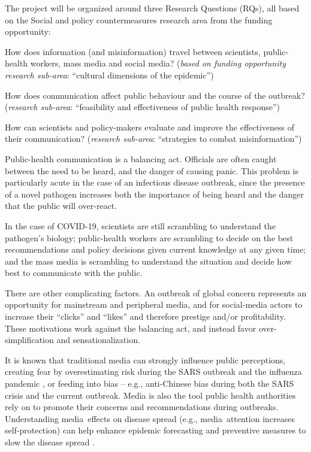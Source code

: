 The project will be organized around three Research Questions (RQs), all based on the Social and policy countermeasures research area from the funding opportunity:

 How does information (and misinformation) travel between scientists, public-health workers, mass media and social media? (\emph{based on funding opportunity research sub-area}: ``cultural dimensions of the epidemic'')

 How does communication affect public behaviour and the course of the outbreak? (\emph{research sub-area}: ``feasibility and effectiveness of public health response'') 

 How can scientists and policy-makers evaluate and improve the effectiveness of their communication? (\emph{research sub-area}: ``strategies to combat misinformation'')


Public-health communication is a balancing act. Officials are often caught between the need to be heard, and the danger of causing panic. This problem is particularly acute in the case of an infectious disease outbreak, since the presence of a novel pathogen increases both the importance of being heard and the danger that the public will over-react. 

In the case of COVID-19, scientists are still scrambling to understand the pathogen's biology; public-health workers are scrambling to decide on the best recommendations and policy decisions given current knowledge at any given time; and the mass media is scrambling to understand the situation and decide how best to communicate with the public. 

There are other complicating factors. An outbreak of global concern represents an opportunity for mainstream and peripheral media, and for social-media actors to increase their ``clicks'' and ``likes'' and therefore prestige and/or profitability. These motivations work against the balancing act, and instead favor over-simplification and sensationalization.

It is known that traditional media can strongly influence public perceptions, creating fear by overestimating risk during the SARS outbreak \citep{BerrWhar07} and the influenza pandemic \citep{TchuDube11}, or feeding into bias -- e.g., anti-Chinese bias during both the SARS crisis \citep{HuanLeun06} and the current outbreak.
Media is also the tool public health authorities rely on to promote their concerns and recommendations during outbreaks.  Understanding media effects on disease spread (e.g., media attention increases self-protection) can help enhance epidemic forecasting and preventive measures to slow the disease spread \citep{KimFast19}.  


